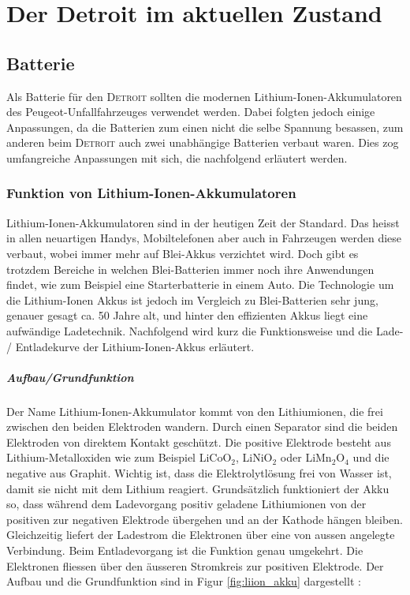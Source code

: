 \chapter{Der Detroit im aktuellen Zustand}

\section{Batterie}
Als Batterie für den \textsc{Detroit} sollten die modernen Lithium-Ionen-Akkumulatoren des Peugeot-Unfallfahrzeuges verwendet werden. Dabei folgten jedoch einige Anpassungen, da die Batterien zum einen nicht die selbe Spannung besassen, zum anderen beim \textsc{Detroit} auch zwei unabhängige Batterien verbaut waren. Dies zog umfangreiche Anpassungen mit sich, die nachfolgend erläutert werden.

\subsection{Funktion von Lithium-Ionen-Akkumulatoren} \label{kap_liion}

Lithium-Ionen-Akkumulatoren sind in der heutigen Zeit der Standard. Das heisst in allen neuartigen Handys, Mobiltelefonen aber auch in Fahrzeugen werden diese verbaut, wobei immer mehr auf Blei-Akkus verzichtet wird. Doch gibt es trotzdem Bereiche in welchen Blei-Batterien immer noch ihre Anwendungen findet, wie zum Beispiel eine Starterbatterie in einem Auto. Die Technologie um die Lithium-Ionen Akkus ist jedoch im Vergleich zu Blei-Batterien sehr jung, genauer gesagt ca. 50 Jahre alt, und hinter den effizienten Akkus liegt eine aufwändige Ladetechnik. Nachfolgend wird kurz die Funktionsweise und die Lade- / Entladekurve der Lithium-Ionen-Akkus erläutert.

\paragraph{Aufbau/Grundfunktion}
Der Name Lithium-Ionen-Akkumulator kommt von den Lithiumionen, die frei zwischen den beiden Elektroden wandern. Durch einen Separator sind die beiden Elektroden von direktem Kontakt geschützt. Die positive Elektrode besteht aus Lithium-Metalloxiden wie zum Beispiel LiCoO$_2$, LiNiO$_2$ oder LiMn$_2$O$_4$ und die negative aus Graphit. Wichtig ist, dass die Elektrolytlösung frei von Wasser ist, damit sie nicht mit dem Lithium reagiert.
Grundsätzlich funktioniert der Akku so, dass während dem Ladevorgang positiv geladene Lithiumionen von der positiven zur negativen Elektrode übergehen und an der Kathode hängen bleiben. Gleichzeitig liefert der Ladestrom die Elektronen über eine von aussen angelegte Verbindung. Beim Entladevorgang ist die Funktion genau umgekehrt. Die Elektronen fliessen über den äusseren Stromkreis zur positiven Elektrode. Der Aufbau und die Grundfunktion sind in Figur \ref{fig:liion_akku} dargestellt \cite{liion_akku_aufbau_funktion2}:

